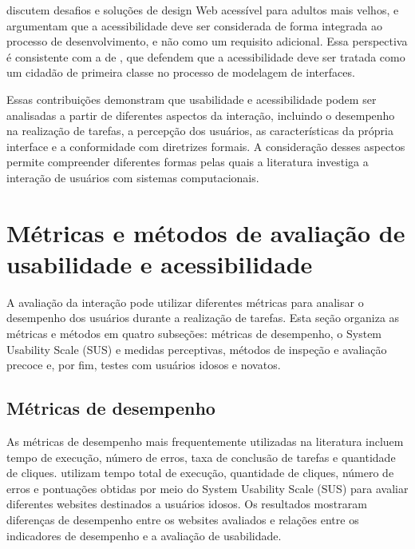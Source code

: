 \cite{chiriboga2025accessible} discutem desafios e soluções de design Web acessível para adultos mais velhos, e argumentam que a acessibilidade deve ser considerada de forma integrada ao processo de desenvolvimento, e não como um requisito adicional. Essa perspectiva é consistente com a de \cite{wickramathilaka2023addressing}, que defendem que a acessibilidade deve ser tratada como um cidadão de primeira classe no processo de modelagem de interfaces.

Essas contribuições demonstram que usabilidade e acessibilidade podem ser analisadas a partir de diferentes aspectos da interação, incluindo o desempenho na realização de tarefas, a percepção dos usuários, as características da própria interface e a conformidade com diretrizes formais. A consideração desses aspectos permite compreender diferentes formas pelas quais a literatura investiga a interação de usuários com sistemas computacionais.

\section{Métricas e métodos de avaliação de usabilidade e acessibilidade}

\label{sec:metricas}

A avaliação da interação pode utilizar diferentes métricas para analisar o desempenho dos usuários durante a realização de tarefas. Esta seção organiza as métricas e métodos em quatro subseções: métricas de desempenho, o System Usability Scale (SUS) e medidas perceptivas, métodos de inspeção e avaliação precoce e, por fim, testes com usuários idosos e novatos.

\subsection{Métricas de desempenho}

\label{sec:metricas_desempenho}

As métricas de desempenho mais frequentemente utilizadas na literatura incluem tempo de execução, número de erros, taxa de conclusão de tarefas e quantidade de cliques. \cite{weighted_heuristic} utilizam tempo total de execução, quantidade de cliques, número de erros e pontuações obtidas por meio do System Usability Scale (SUS) para avaliar diferentes websites destinados a usuários idosos. Os resultados mostraram diferenças de desempenho entre os websites avaliados e relações entre os indicadores de desempenho e a avaliação de usabilidade.

